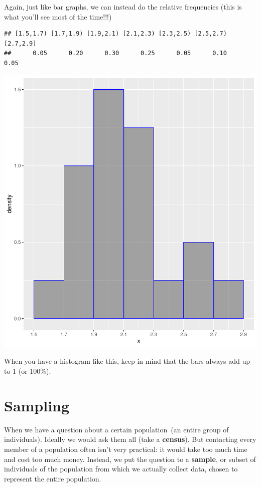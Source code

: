 \documentclass[
]{book}
\begin{document}
Again, just like bar graphs, we can instead do the relative frequencies
(this is what you'll see most of the time!!!)

\begin{verbatim}
## [1.5,1.7) [1.7,1.9) [1.9,2.1) [2.1,2.3) [2.3,2.5) [2.5,2.7) [2.7,2.9] 
##      0.05      0.20      0.30      0.25      0.05      0.10      0.05
\end{verbatim}

\includegraphics{_main_files/figure-latex/unnamed-chunk-32-1.pdf}

When you have a histogram like this, keep in mind that the bars always
add up to 1 (or 100\%).

\hypertarget{sampling}{%
\chapter{Sampling}\label{sampling}}

When we have a question about a certain population~(an entire group of
individuals). Ideally we would ask them all (take a \textbf{census}). But
contacting every member of a population often isn't very practical: it
would take too much time and cost too much money. Instead, we put the
question to a \textbf{sample}, or subset of individuals of the population
from which we actually collect data, chosen to represent the entire
population.
\end{document}
